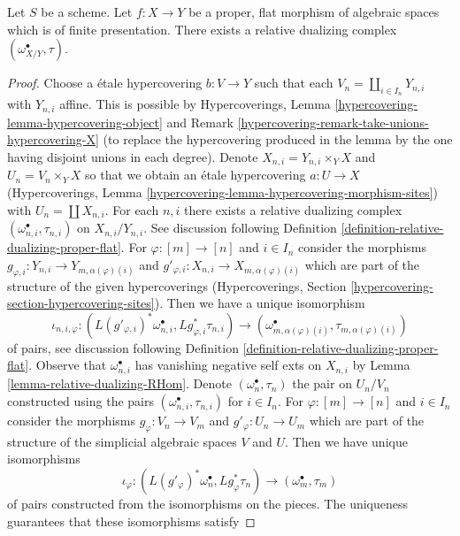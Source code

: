 \begin{lemma}
\label{lemma-existence-relative-dualizing}
Let $S$ be a scheme. Let $f : X \to Y$ be a proper, flat morphism of
algebraic spaces which is of finite presentation.
There exists a relative dualizing complex $(\omega_{X/Y}^\bullet, \tau)$.
\end{lemma}

\begin{proof}
Choose a \'etale hypercovering $b : V \to Y$ such that each
$V_n = \coprod_{i \in I_n} Y_{n, i}$ with $Y_{n, i}$ affine.
This is possible by Hypercoverings, Lemma
\ref{hypercovering-lemma-hypercovering-object} and
Remark \ref{hypercovering-remark-take-unions-hypercovering-X}
(to replace the hypercovering produced
in the lemma by the one having disjoint unions in each degree).
Denote $X_{n, i} = Y_{n, i} \times_Y X$ and $U_n = V_n \times_Y X$
so that we obtain an \'etale hypercovering
$a : U \to X$ (Hypercoverings, Lemma
\ref{hypercovering-lemma-hypercovering-morphism-sites})
with $U_n = \coprod X_{n, i}$.
For each $n, i$ there exists a relative dualizing complex
$(\omega_{n, i}^\bullet, \tau_{n, i})$ on $X_{n, i}/Y_{n, i}$.
See discussion following
Definition \ref{definition-relative-dualizing-proper-flat}.
For $\varphi : [m] \to [n]$ and $i \in I_n$ consider the morphisms
$g_{\varphi, i} : Y_{n, i} \to Y_{m, \alpha(\varphi)(i)}$ and
$g'_{\varphi, i} : X_{n, i} \to X_{m, \alpha(\varphi)(i)}$
which are part of the structure of the given hypercoverings
(Hypercoverings, Section \ref{hypercovering-section-hypercovering-sites}).
Then we have a unique isomorphism
$$
\iota_{n, i, \varphi} :
(L(g'_{\varphi, i})^*\omega_{n, i}^\bullet, Lg_{\varphi, i}^*\tau_{n, i})
\longrightarrow
(\omega_{m, \alpha(\varphi)(i)}^\bullet, \tau_{m, \alpha(\varphi)(i)})
$$
of pairs, see discussion following
Definition \ref{definition-relative-dualizing-proper-flat}.
Observe that $\omega_{n, i}^\bullet$ has vanishing negative
self exts on $X_{n, i}$ by Lemma \ref{lemma-relative-dualizing-RHom}.
Denote $(\omega_n^\bullet, \tau_n)$ the pair on $U_n/V_n$ constructed using
the pairs $(\omega_{n, i}^\bullet, \tau_{n, i})$ for $i \in I_n$.
For $\varphi : [m] \to [n]$ and $i \in I_n$ consider the morphisms
$g_\varphi : V_n \to V_m$ and $g'_\varphi : U_n \to U_m$ which are part
of the structure of the simplicial algebraic spaces $V$ and $U$.
Then we have unique isomorphisms
$$
\iota_\varphi :
(L(g'_\varphi)^*\omega_n^\bullet, Lg_\varphi^*\tau_n)
\longrightarrow
(\omega_m^\bullet, \tau_m)
$$
of pairs constructed from the isomorphisms on the pieces.
The uniqueness guarantees that these isomorphisms satisfy

\end{proof}
